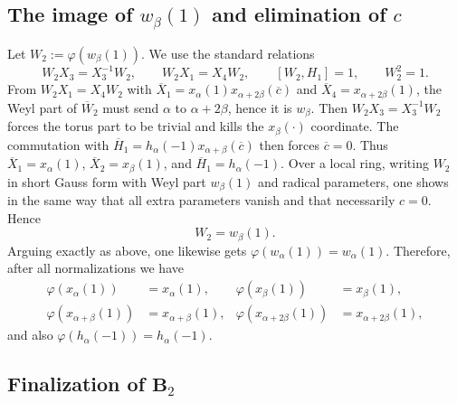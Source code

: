 \documentclass[]{jgcc}
\numberwithin{equation}{section}
\begin{document}
\subsection{\texorpdfstring{The image of $w_\beta(1)$ and elimination of $c$}{The image of wbeta(1) and elimination of c}}

Let $W_2:=\varphi(w_\beta(1))$.
We use the standard relations
\[
W_2X_3=X_3^{-1}W_2,\qquad W_2X_1=X_4W_2,\qquad [W_2,H_1]=1,\qquad W_2^2=1.
\]
From $W_2X_1=X_4W_2$ with $\overline X_1=x_\alpha(1)x_{\alpha+2\beta}(\overline c)$ and $\overline X_4=x_{\alpha+2\beta}(1)$,
the Weyl part of $\overline W_2$ must send $\alpha$ to $\alpha+2\beta$, hence it is $w_\beta$.
Then $W_2X_3=X_3^{-1}W_2$ forces the torus part to be trivial and kills the $x_\beta(\cdot)$ coordinate.
The commutation with $\overline H_1=h_\alpha(-1)x_{\alpha+\beta}(\overline c)$ then forces $\overline c=0$.
Thus $\overline X_1=x_\alpha(1)$, $\overline X_2=x_\beta(1)$, and $\overline H_1=h_\alpha(-1)$.
Over a local ring, writing $W_2$ in short Gauss form with Weyl part $w_\beta(1)$ and radical parameters,
one shows in the same way that all extra parameters vanish and that necessarily $c=0$.
Hence
\[
W_2=w_\beta(1).
\]
Arguing exactly as above, one likewise gets $\varphi(w_\alpha(1))=w_\alpha(1)$.
Therefore, after all normalizations we have
\begin{align*}
\varphi(x_\alpha(1))&=x_\alpha(1),&
\varphi(x_\beta(1))&=x_\beta(1),\\
\varphi(x_{\alpha+\beta}(1))&=x_{\alpha+\beta}(1),&
\varphi(x_{\alpha+2\beta}(1))&=x_{\alpha+2\beta}(1),
\end{align*}
and also $\varphi(h_\alpha(-1))=h_\alpha(-1)$.

\subsection{\texorpdfstring{Finalization of $\mathbf B_2$}{Finalization of B2}}
\end{document}
